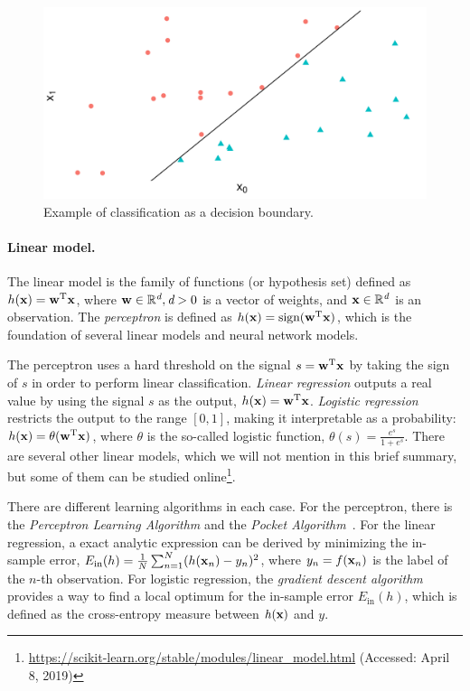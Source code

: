 %
\begin{figure}
    \centering
    \includegraphics[width=.8\textwidth]{figures/background/classification-example}
    \caption{Example of classification as a decision boundary.}
    \label{background:fig:clf-ex}
\end{figure}%


\paragraph{Linear model.} The linear model is the family of functions (or
hypothesis set) defined as $h(\boldsymbol{\mathbf{x}}) = \boldsymbol{\mathbf{w}}^{\text{T}}\boldsymbol{\mathbf{x}}$, where
$\boldsymbol{\mathbf{w}} \in \mathbb{R}^\textit{d}, \textit{d} > 0$ is a vector of weights, and
$\boldsymbol{\mathbf{x}}\in \mathbb{R}^\textit{d}$ is an observation. 
%
The {\em perceptron} is defined as $h(\boldsymbol{\mathbf{x}}) =
\text{sign}(\boldsymbol{\mathbf{w}}^{\text{T}}\boldsymbol{\mathbf{x}})$, which is the foundation of several
linear models and neural network models.


The perceptron uses a hard threshold on the signal $s =
\boldsymbol{\mathbf{w}}^{\text{T}}\boldsymbol{\mathbf{x}}$ by taking the sign of $s$ in order to perform linear
classification.
%
{\em Linear regression} outputs a real value by using the signal $s$ as the
output, $h(\boldsymbol{\mathbf{x}}) = \boldsymbol{\mathbf{w}}^{\text{T}}\boldsymbol{\mathbf{x}}$.
%
{\em Logistic regression} restricts the output to the range $[0, 1]$, making
it interpretable as a probability: $h(\boldsymbol{\mathbf{x}}) =
\theta(\boldsymbol{\mathbf{w}}^{\text{T}}\boldsymbol{\mathbf{x}})$, where $\theta$ is the so-called logistic
function, $\theta(s) = \frac{e^s}{1 + e^s}$.
%
There are several other linear models, which we will not mention in this brief
summary, but some of them can be studied
online\footnote{\url{https://scikit-learn.org/stable/modules/linear_model.html}
(Accessed: April 8, 2019)}.


There are different learning algorithms in each case. 
%
For the perceptron, there is the {\em Perceptron Learning Algorithm} and the
{\em Pocket Algorithm}~\cite{Abu-Mostafa:2012:LD:2207825}. 
%
For the linear regression, a exact analytic expression can be derived by
minimizing the in-sample error, $E_{\text{in}}(h) = \frac{1}{N} \sum_{n=1}^{N}
(h(\boldsymbol{\mathbf{x}}_n) - y_n)^2$, where $y_n = f(\boldsymbol{\mathbf{x}}_n)$ is the label of the $n$-th
observation.
%
For logistic regression, the {\em gradient descent algorithm} provides a way to
find a local optimum for the in-sample error $E_{\text{in}}(h)$, which is
defined as the cross-entropy measure between $h(\boldsymbol{\mathbf{x}})$ and $y$. 

